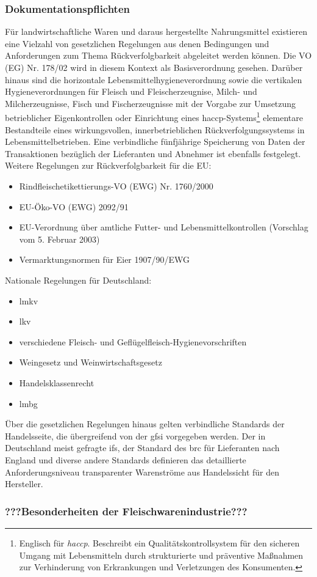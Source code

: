 \subsubsection{Dokumentationspflichten}
Für landwirtschaftliche Waren und daraus hergestellte Nahrungsmittel existieren eine Vielzahl von gesetzlichen Regelungen aus denen Bedingungen und Anforderungen zum Thema Rückverfolgbarkeit abgeleitet werden können. Die VO (EG) Nr. 178/02 \citep{EPER2002} wird in diesem Kontext als Basisverordnung gesehen. Darüber hinaus sind die horizontale Lebensmittelhygieneverordnung sowie die vertikalen Hygieneverordnungen für Fleisch und Fleischerzeugnise, Milch- und Milcherzeugnisse, Fisch und Fischerzeugnisse mit der Vorgabe zur Umsetzung betrieblicher Eigenkontrollen oder Einrichtung eines \acs{haccp}-Systems\footnote{Englisch für \textit{\acf{haccp}}. Beschreibt ein Qualitätskontrollsystem für den sicheren Umgang mit Lebensmitteln durch strukturierte und präventive Maßnahmen zur Verhinderung von Erkrankungen und Verletzungen des Konsumenten.\citep{EPER2004}} elementare Bestandteile eines wirkungsvollen, innerbetrieblichen Rückverfolgungssystems in Lebensmittelbetrieben. Eine verbindliche fünfjährige Speicherung von Daten der Transaktionen bezüglich der Lieferanten und Abnehmer ist ebenfalls festgelegt.\\

\noindent
Weitere Regelungen zur Rückverfolgbarkeit für die EU:
\begin{itemize}
  \item Rindfleischetikettierungs-VO (EWG) Nr. 1760/2000
  \item EU-Öko-VO (EWG) 2092/91
  \item EU-Verordnung über amtliche Futter- und Lebensmittelkontrollen (Vorschlag vom 5. Februar 2003)
  \item Vermarktungsnormen für Eier 1907/90/EWG
\end{itemize}
Nationale Regelungen für Deutschland:
\begin{itemize}
  \item \acf{lmkv}
  \item \acf{lkv}
  \item verschiedene Fleisch- und Geflügelfleisch-Hygienevorschriften
  \item Weingesetz und Weinwirtschaftsgesetz
  \item Handelsklassenrecht
  \item \acf{lmbg}
\end{itemize}
Über die gesetzlichen Regelungen hinaus gelten verbindliche Standards der Handelsseite, die übergreifend von der \ac{gfsi} vorgegeben werden. Der in Deutschland meist gefragte \ac{ifs}, der Standard des \ac{brc} für Lieferanten nach England und diverse andere Standards definieren das detaillierte Anforderungsniveau transparenter Warenströme aus Handelssicht für den Hersteller.

\subsubsection{???Besonderheiten der Fleischwarenindustrie???}
